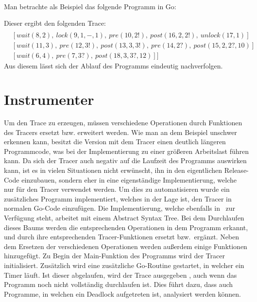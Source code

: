 Man betrachte als Beispiel das folgende Programm in Go:

% 
Dieser ergibt den folgenden Trace:
\begin{align*}
  [&[signal(1, 2),\ signal(2, 3),\ signal(3, 4),\ pre(4, 3?, default),\ post(5, default)]\\
  &[wait(8, 2),\ lock(9, 1, -, 1),\ pre(10, 2!),\ post(16, 2, 2!),\ unlock(17, 1)]\\
  &[wait(11, 3),\ pre(12, 3!),\ post(13, 3, 3!),\ pre(14, 2?),\ post(15, 2, 2?, 10)]\\
  &[wait(6, 4),\ pre(7, 3?),\ post(18, 3, 3?, 12)]]
\end{align*}
Aus diesem lässt sich der Ablauf des Programms
eindeutig nachverfolgen.


\section{Instrumenter}\label{Chap:Tracer-Sec:Instrumenter}
Um den Trace zu erzeugen, müssen verschiedene Operationen durch Funktionen
des Tracers ersetzt bzw. erweitert werden. Wie man an dem Beispiel 
unschwer erkennen kann, besitzt die Version mit dem Tracer einen deutlich längeren
Programmcode, was bei der Implementierung zu einer größeren Arbeitslast 
führen kann. Da sich der Tracer auch negativ auf die Laufzeit des Programms 
auswirken kann, ist es in vielen Situationen nicht erwünscht, ihn in den 
eigentlichen Release-Code einzubauen, sondern eher in eine eigenständige 
Implementierung, welche nur für den Tracer verwendet werden. Um dies zu
automatisieren wurde ein zusätzliches Programm implementiert, welches in der 
Lage ist, den Tracer in normalen Go-Code einzufügen. Die Implementierung, 
welche ebenfalls in~\cite{GoChan} zur Verfügung steht, arbeitet mit einem 
Abstract Syntax Tree. Bei dem Durchlaufen dieses Baums werden die 
entsprechenden Operationen in dem Programm erkannt, und durch ihre entsprechenden 
Tracer-Funktionen ersetzt bzw.\ ergänzt. Neben dem Ersetzen der verschiedenen 
Operationen werden außerdem einige Funktionen hinzugefügt. Zu Begin der 
Main-Funktion des Programms wird der Tracer initialisiert. Zusätzlich
wird eine zusätzliche Go-Routine gestartet, in welcher ein Timer läuft. 
Ist dieser abgelaufen, wird der Trace ausgegeben , 
auch wenn das Programm noch nicht vollständig durchlaufen ist. Dies führt dazu,
dass auch Programme, in welchen ein Deadlock aufgetreten ist, analysiert 
werden können. 

